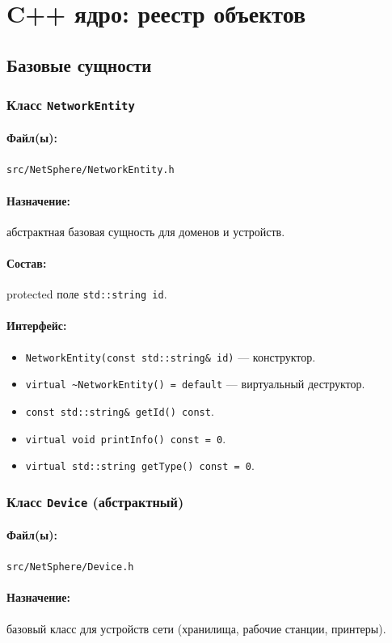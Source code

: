 \documentclass[14pt,a4paper]{extarticle}
\begin{document}
\section{C++ ядро: реестр объектов}
\subsection{Базовые сущности}

\subsubsection{Класс \texttt{NetworkEntity}}
\paragraph{Файл(ы):} \texttt{src/NetSphere/NetworkEntity.h}
\paragraph{Назначение:} абстрактная базовая сущность для доменов и устройств.
\paragraph{Состав:}
protected поле \texttt{std::string id}.
\paragraph{Интерфейс:}
\begin{itemize}
  \item \texttt{NetworkEntity(const std::string\& id)} --- конструктор.
  \item \texttt{virtual \~{}NetworkEntity() = default} --- виртуальный деструктор.
  \item \texttt{const std::string\& getId() const}.
  \item \texttt{virtual void printInfo() const = 0}.
  \item \texttt{virtual std::string getType() const = 0}.
\end{itemize}

\subsubsection{Класс \texttt{Device} (абстрактный)}
\paragraph{Файл(ы):} \texttt{src/NetSphere/Device.h}
\paragraph{Назначение:} базовый класс для устройств сети (хранилища, рабочие станции, принтеры).
\end{document}
